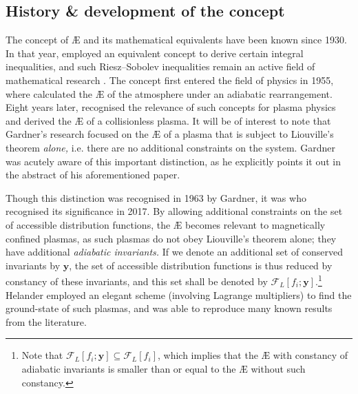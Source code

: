 \subsection{History \& development of the concept}
The concept of \AE{} and its mathematical equivalents have been known since 1930. In that year, \citet{riesz1930inegalite} employed an equivalent concept to derive certain integral inequalities, and such Riesz–Sobolev inequalities remain an active field of mathematical research \cite{burchard1996cases,burchard2006rearrangement,hajaiej2011necessity,carlen2017stability,frank2019proof}. The concept first entered the field of physics in 1955, where \citet{lorenz1955available} calculated the \AE{} of the atmosphere under an adiabatic rearrangement. Eight years later, \citet{gardner1963bound} recognised the relevance of such concepts for plasma physics and derived the \AE{} of a collisionless plasma. It will be of interest to note that Gardner's research focused on the \AE{} of a plasma that is subject to Liouville's theorem {\it alone,} i.e. there are no additional constraints on the system. Gardner was acutely aware of this important distinction, as he explicitly points it out in the abstract of his aforementioned paper. \par 
Though this distinction was recognised in 1963 by Gardner, it was \citet{helander2017available,helander2020available} who recognised its significance in 2017. By allowing additional constraints on the set of accessible distribution functions, the \AE{} becomes relevant to magnetically confined plasmas, as such plasmas do not obey Liouville's theorem alone; they have additional {\it adiabatic invariants.} If we denote an additional set of conserved invariants by $\boldsymbol{y}$, the set of accessible distribution functions is thus reduced by constancy of these invariants, and this set shall be denoted by $\mathcal{F}_L[f_i;\boldsymbol{y}]$.\footnote{Note that $\mathcal{F}_L[f_i;\boldsymbol{y}] \subseteq \mathcal{F}_L[f_i]$, which implies that the \AE{} with constancy of adiabatic invariants is smaller than or equal to the \AE{} without such constancy.} Helander employed an elegant scheme (involving Lagrange multipliers) to find the ground-state of such plasmas, and was able to reproduce many known results from the literature. \par 

